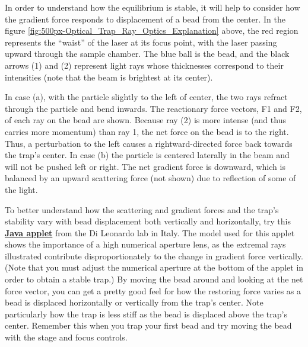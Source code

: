 \documentclass{../lab}
\begin{document}
In order to understand how the equilibrium is stable, it will help to consider how the gradient force responds to displacement of a bead from the center. In the figure \ref{fig:500px-Optical_Trap_Ray_Optics_Explanation} above, the red region represents the ``waist'' of the laser at its focus point, with the laser passing upward through the sample chamber. The blue ball is the bead, and the black arrows (1) and (2) represent light rays whose thicknesses correspond to their intensities (note that the beam is brightest at its center).

\newpage

In case (a), with the particle slightly to the left of center, the two rays refract through the particle and bend inwards. The reactionary force vectors, F1 and F2, of each ray on the bead are shown. Because ray (2) is more intense (and thus carries more momentum) than ray 1, the net force on the bead is to the right. Thus, a perturbation to the left causes a rightward-directed force back towards the trap's center. In case (b) the particle is centered laterally in the beam and will not be pushed left or right. The net gradient force is downward, which is balanced by an upward scattering force (not shown) due to reflection of some of the light.

To better understand how the scattering and gradient forces and the trap's stability vary with bead displacement both vertically and horizontally, try this \href{http://glass.phys.uniroma1.it/dileonardo/content/apps/trapforces.php}{\textbf{Java applet}} from the Di Leonardo lab \cite{Leonardo} in Italy. The model used for this applet shows the importance of a high numerical aperture lens, as the extremal rays illustrated contribute disproportionately to the change in gradient force vertically. (Note that you must adjust the numerical aperture at the bottom of the applet in order to obtain a stable trap.) By moving the bead around and looking at the net force vector, you can get a pretty good feel for how the restoring force varies as a bead is displaced horizontally or vertically from the trap's center. Note particularly how the trap is less stiff as the bead is displaced above the trap's center. Remember this when you trap your first bead and try moving the bead with the stage and focus controls.
\end{document}
